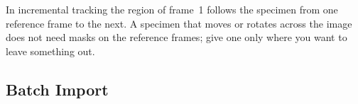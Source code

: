 \begin{tipbox}
In incremental tracking the region of frame~1 follows the specimen from one reference frame to
the next. A specimen that moves or rotates across the image does not need masks on the
reference frames; give one only where you want to leave something out.
\end{tipbox}

\subsection{Batch Import}
\label{sec:roi-batch}



